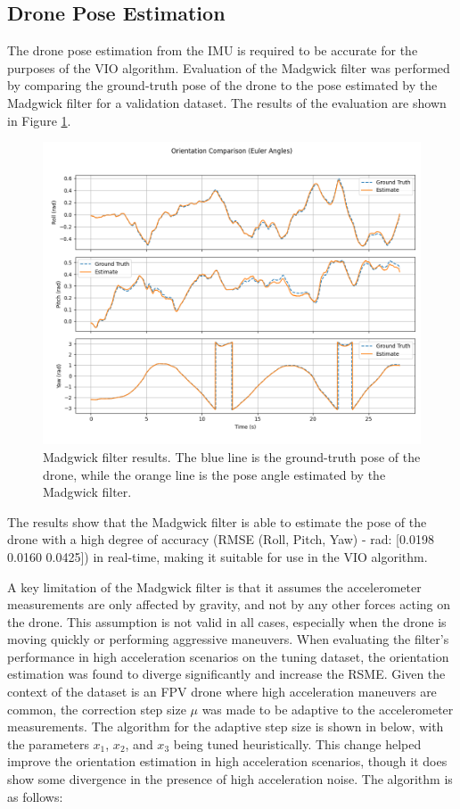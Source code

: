 \documentclass[bare_jrnl_transmag]{subfiles}
\begin{document}
\subsection{Drone Pose Estimation}
The drone pose estimation from the IMU is required to be accurate for the purposes of the VIO algorithm. Evaluation of the Madgwick filter was performed by comparing the ground-truth pose of the drone to the pose estimated by the Madgwick filter for a validation dataset. The results of the evaluation are shown in Figure \ref{fig:madgwick_results}.

\begin{figure}[H]
    \centering
    \includegraphics[width=0.8\linewidth]{figures/madgwick_results.png}
    \caption{Madgwick filter results. The blue line is the ground-truth pose of the drone, while the orange line is the pose angle estimated by the Madgwick filter.}
    \label{fig:madgwick_results}
\end{figure}

The results show that the Madgwick filter is able to estimate the pose of the drone with a high degree of accuracy (RMSE (Roll, Pitch, Yaw) - rad: [0.0198 0.0160 0.0425]) in real-time, making it suitable for use in the VIO algorithm.

A key limitation of the Madgwick filter is that it assumes the accelerometer measurements are only affected by gravity, and not by any other forces acting on the drone. This assumption is not valid in all cases, especially when the drone is moving quickly or performing aggressive maneuvers. When evaluating the filter's performance in high acceleration scenarios on the tuning dataset, the orientation estimation was found to diverge significantly and increase the RSME. Given the context of the dataset is an FPV drone where high acceleration maneuvers are common, the correction step size $\mu$ was made to be adaptive to the accelerometer measurements. The algorithm for the adaptive step size is shown in below, with the parameters $x_1$, $x_2$, and $x_3$ being tuned heuristically. This change helped improve the orientation estimation in high acceleration scenarios, though it does show some divergence in the presence of high acceleration noise. The algorithm is as follows:
\end{document}
